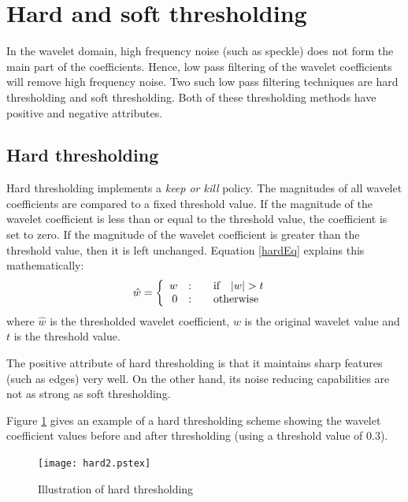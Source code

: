 \documentclass[12pt]{report}
\begin{document}
\section{Hard and soft thresholding}
\label{sec:sht}
In the wavelet domain, high frequency noise (such as speckle) does not form the
main part of the coefficients. Hence, low pass filtering of the wavelet coefficients
will remove high frequency noise. Two such low pass filtering techniques are
hard thresholding and soft thresholding. Both of these thresholding methods
have positive and negative attributes.

\subsection{Hard thresholding}
Hard thresholding implements a \emph{keep or kill} policy. The magnitudes 
of all wavelet coefficients are compared to a fixed threshold value.
If the magnitude of the wavelet coefficient is less than or equal to the 
threshold value, the coefficient
is set to zero. If the magnitude of the wavelet coefficient is greater than the threshold value, then
it is left unchanged. Equation \ref{hardEq} explains this mathematically:
\begin{equation}
        \hat{w} =  \left\{ \begin{array}{r@{\quad:\quad}l} w &
                        \quad\mbox{if}\quad |w| > t \\
                        0 & \quad\mbox{otherwise}\quad
                        \end{array} \right.
	\label{hardEq}
\end{equation}	
where $\hat{w}$ is the thresholded wavelet coefficient, $w$ is the original wavelet value and
$t$ is the threshold value.

The positive attribute of hard thresholding is that it maintains sharp features (such as edges)
very well. On the other hand, its noise reducing capabilities are not as strong as soft thresholding.

Figure \ref{hardFig} gives an example of a hard thresholding scheme showing the 
wavelet coefficient values before and after thresholding (using a threshold value of 0.3).

\begin{figure}[htb]
	\begin{center}
		\texttt{[image: hard2.pstex]}
	\caption{Illustration of hard thresholding} 
	\label{hardFig}
	\end{center}
\end{figure}
\end{document}
